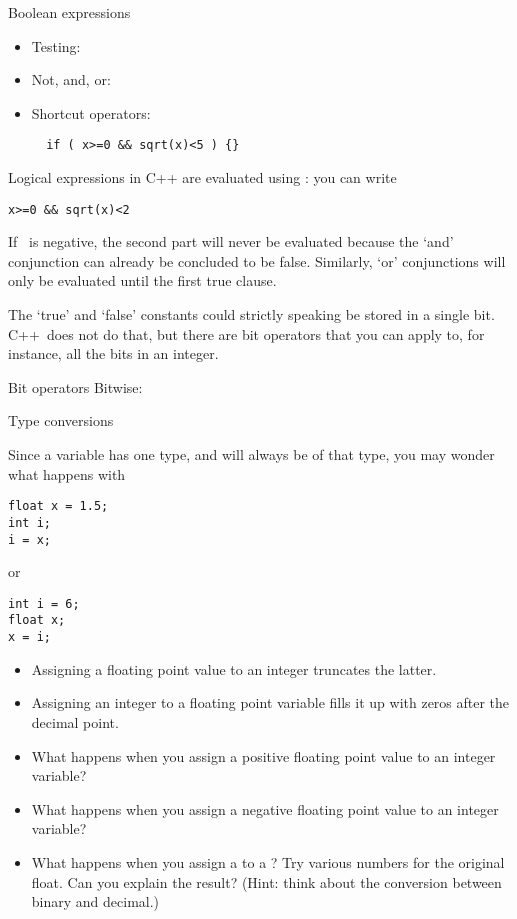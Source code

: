 \begin{block}{Boolean expressions}
  \label{sl:bool-expr}
  \begin{itemize}
  \item Testing: \n{== != < > <= >=}
  \item Not, and, or:   \n{! && ||}
  \item Shortcut operators:
\begin{verbatim}
  if ( x>=0 && sqrt(x)<5 ) {}
\end{verbatim}
  \end{itemize}
\end{block}

Logical expressions in C++ are evaluated using
: you can write
\begin{verbatim}
x>=0 && sqrt(x)<2
\end{verbatim}
If ~is negative, the second part will never be evaluated because
the `and' conjunction can already be concluded to be false.
Similarly, `or' conjunctions will only be evaluated until the first
true clause.

The `true' and `false' constants could strictly speaking be stored in
a single bit. C++~does not do that, but there are bit
operators that you can apply to, for instance, all the bits in an integer.

\begin{block}{Bit operators}
  \label{sl:bit-oper}
 Bitwise: \n{& | ^}
\end{block}

 {Type conversions}

Since a variable has one type, and will always be of that type,
you may wonder what happens with
\begin{verbatim}
float x = 1.5;
int i;
i = x;
\end{verbatim}
or 
\begin{verbatim}
int i = 6;
float x;
x = i;
\end{verbatim}

\begin{itemize}
\item Assigning a floating point value to an integer truncates the
  latter.
\item Assigning an integer to a floating point variable fills it up
  with zeros after the decimal point.
\end{itemize}

\begin{exercise}
  \label{ex:float-convert}
  \begin{itemize}
  \item What happens when you assign a positive floating
    point value to an integer variable?
  \item What happens when you assign a negative floating
    point value to an integer variable?
  \item What happens when you assign a  to a ? 
    Try various numbers for the original float. Can you explain the
    result?
    (Hint: think about the conversion between binary and decimal.)
  \end{itemize}
\end{exercise}


